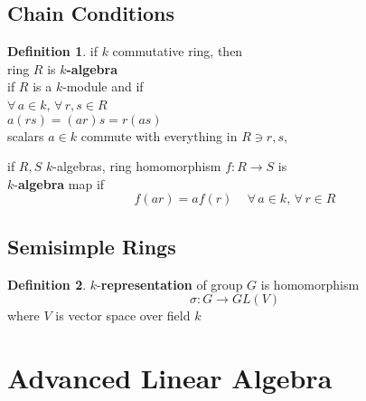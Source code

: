 \documentclass[twoside,landscape]{amsart}
\theoremstyle{plain}
\theoremstyle{definition}
\newtheorem{definition}{Definition}
\theoremstyle{remark}
\begin{document}
\begin{multicols*}{2}
\subsection{Chain Conditions}

\begin{definition}
  if $k$ commutative ring, then \\
  ring $R$ is \textbf{$k$-algebra} \\
if $R$ is a $k$-module and if \\
$\forall \, a \in k$, $\forall \, r,s \in R$ \\
$a(rs) = (ar)s = r(as)$ \\
scalars $a \in k$ commute with everything in $R \ni r,s,$  
\end{definition}

if $R,S$ $k$-algebras, ring homomorphism $f:R \to S$ is \\
$k$-\textbf{algebra} map if 
\[
f(ar) = af(r) \quad \, \forall \, a \in k , \, \forall \, r \in R
\]

\subsection{Semisimple Rings}

\begin{definition}
  $k$-\textbf{representation} of group $G$ is homomorphism
\[
\sigma : G \to GL(V) 
\]
where $V$ is vector space over field $k$
\end{definition}



\section{ Advanced Linear Algebra }

\subsection{}
\subsection{}
\subsection{}
\subsection{}
\subsection{}

\end{multicols*}
\end{document}
